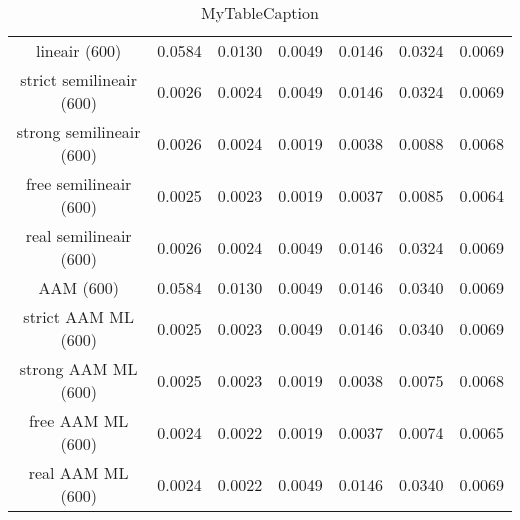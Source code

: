 \begin{table}
\centering
\begin{tabular}{|c|c|c|c|c|c|c|}
\hline
 &  &  &  &  &  &  \\
\hline
lineair (600) & 0.0584 & 0.0130 & 0.0049 & 0.0146 & 0.0324 & 0.0069 \\
\hline
strict semilineair (600) & 0.0026 & 0.0024 & 0.0049 & 0.0146 & 0.0324 & 0.0069 \\
\hline
strong semilineair (600) & 0.0026 & 0.0024 & 0.0019 & 0.0038 & 0.0088 & 0.0068 \\
\hline
free semilineair (600) & 0.0025 & 0.0023 & 0.0019 & 0.0037 & 0.0085 & 0.0064 \\
\hline
real semilineair (600) & 0.0026 & 0.0024 & 0.0049 & 0.0146 & 0.0324 & 0.0069 \\
\hline
AAM (600) & 0.0584 & 0.0130 & 0.0049 & 0.0146 & 0.0340 & 0.0069 \\
\hline
strict AAM ML (600) & 0.0025 & 0.0023 & 0.0049 & 0.0146 & 0.0340 & 0.0069 \\
\hline
strong AAM ML (600) & 0.0025 & 0.0023 & 0.0019 & 0.0038 & 0.0075 & 0.0068 \\
\hline
free AAM ML (600) & 0.0024 & 0.0022 & 0.0019 & 0.0037 & 0.0074 & 0.0065 \\
\hline
real AAM ML (600) & 0.0024 & 0.0022 & 0.0049 & 0.0146 & 0.0340 & 0.0069 \\
\hline
\end{tabular}
\caption{MyTableCaption}
\label{table:MyTableLabel}
\end{table}
